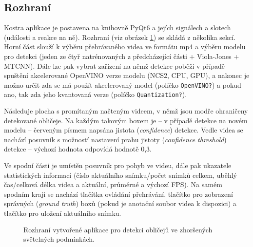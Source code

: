 \subsection*{Rozhraní}
Kostra aplikace je postavena na knihovně PyQt6 a jejích signálech a slotech (události a reakce na ně). Rozhraní (viz obrázek \ref{obrazek:gui}) se skládá z několika sekcí. Horní část slouží k výběru přehrávaného videa ve formátu mp4 a výběru modelu pro detekci (jeden ze čtyř natrénovaných z předcházející části + Viola-Jones + MTCNN). Dále lze pak vybrat zařízení na němž detekce poběží v případě spuštění akcelerované OpenVINO verze modelu (NCS2, CPU, GPU), a nakonec je možno určit zda se má použít akcelerovaný model (políčko \texttt{OpenVINO?}) a pokud ano, tak zda jeho kvantovaná verze (políčko \texttt{Quantization?}).

Následuje plocha s promítaným načteným videem, v němž jsou modře ohraničeny detekované obličeje. Na každým takovým boxem je -- v případě detekce na novém modelu -- červeným písmem napsána jistota (\emph{confidence}) detekce. Vedle videa se nachází posuvník s možností nastavení prahu jistoty (\emph{confidence threshold}) detekce -- výchozí hodnota odpovídá hodnotě 0,3.

Ve spodní části je umístěn posuvník pro pohyb ve videu, dále pak ukazatele statistických informací (číslo aktuálního snímku/počet snímků celkem, uběhlý čas/celková délka videa a aktuální, průměrné a výchozí FPS). Na samém spodním kraji se nachází tlačítka ovládání přehrávání, tlačítko pro zobrazení správných (\emph{ground truth}) boxů (pokud je anotační soubor videa k dispozici) a tlačítko pro uložení aktuálního snímku.


\begin{figure}[H]
  \begin{center}
  \label{obrazek:gui}
  \caption{Rozhraní vytvořené aplikace pro detekci obličejů ve zhoršených světelných podmínkách.}
  \end{center}
\end{figure}

